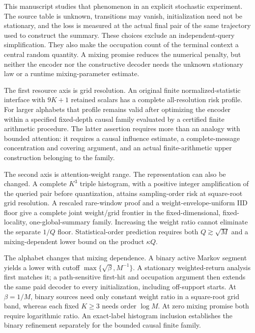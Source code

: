 \documentclass[11pt,letterpaper]{article}
\theoremstyle{definition}\newtheorem{definition}[theorem]{Definition}
\theoremstyle{remark}\newtheorem{remark}[theorem]{Remark}
\begin{document}
This manuscript studies that phenomenon in an explicit stochastic experiment. The source table is unknown, transitions may vanish, initialization need not be stationary, and the loss is measured at the actual final pair of the same trajectory used to construct the summary. These choices exclude an independent-query simplification. They also make the occupation count of the terminal context a central random quantity. A mixing promise reduces the numerical penalty, but neither the encoder nor the constructive decoder needs the unknown stationary law or a runtime mixing-parameter estimate.

The first resource axis is grid resolution. An original finite normalized-statistic interface with $9K+1$ retained scalars has a complete all-resolution risk profile. For larger alphabets that profile remains valid after optimizing the encoder within a specified fixed-depth causal family evaluated by a certified finite arithmetic procedure. The latter assertion requires more than an analogy with bounded attention: it requires a causal influence estimate, a complete-message concentration and covering argument, and an actual finite-arithmetic upper construction belonging to the family.

The second axis is attention-weight range. The representation can also be changed. A complete $K^3$ triple histogram, with a positive integer amplification of the queried pair before quantization, attains sampling-order risk at square-root grid resolution. A rescaled rare-window proof and a weight-envelope-uniform IID floor give a complete joint weight/grid frontier in the fixed-dimensional, fixed-locality, one-global-summary family. Increasing the weight ratio cannot eliminate the separate $1/Q$ floor. Statistical-order prediction requires both $Q\gtrsim\sqrt M$ and a mixing-dependent lower bound on the product $\kappa Q$.

The alphabet changes that mixing dependence. A binary active Markov segment yields a lower with cutoff $\max\{\sqrt\beta,M^{-1}\}$. A stationary weighted-return analysis first matches it; a path-sensitive first-hit and occupation argument then extends the same paid decoder to every initialization, including off-support starts. At $\beta=1/M$, binary sources need only constant weight ratio in a square-root grid band, whereas each fixed $K\ge3$ needs order $\log M$. At zero mixing promise both require logarithmic ratio. An exact-label histogram inclusion establishes the binary refinement separately for the bounded causal finite family.
\end{document}
